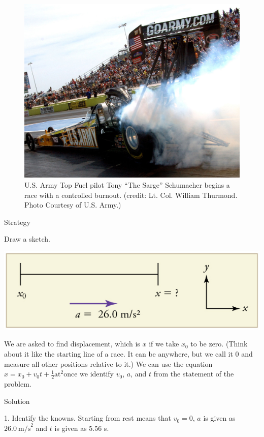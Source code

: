 \documentclass[
]{book}
\begin{document}
\begin{figure}
\hypertarget{import-auto-id2356722}{%
\centering
\includegraphics{images/Figure_02_04_02.jpg}
\caption{U.S. Army Top Fuel pilot Tony ``The Sarge'' Schumacher begins a race
with a controlled burnout. (credit: Lt. Col. William Thurmond. Photo
Courtesy of U.S.
Army.)}\label{import-auto-id2356722}
}
\end{figure}

{Strategy}

Draw a sketch.

\includegraphics{images/Figure_02_04_02a.jpg}

We are asked to find displacement, which is \(x\) if we take \(x_{0}{}\) to
be zero. (Think about it like the starting line of a race. It can be
anywhere, but we call it 0 and measure all other positions relative to
it.) We can use the equation
\({{x = {x_{0} + v_{0}}}{t + \frac{1}{2}}\text{at}^{2}}{}\)\emph{}once
we identify \(v_{0}{}\), \(a{}\), and \(t{}\) from the statement of the
problem.

{Solution}

1. Identify the knowns. \textbf{}Starting from
rest means that \({v_{0} = 0}{}\),
\emph{}\(a{}\)\emph{} is
given as \({\text{26}\text{.}0\ \text{m/s}^{2}}{}\) and
\(t{}\)\emph{} is given as 5.56 s.
\end{document}
